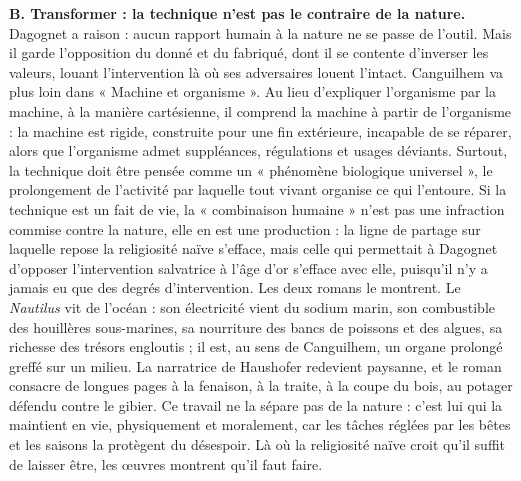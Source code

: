 \documentclass[11pt,a4paper]{article}
\begin{document}
\textbf{B. Transformer : la technique n'est pas le contraire de la nature.} Dagognet a raison : aucun rapport humain à la nature ne se passe de l'outil. Mais il garde l'opposition du donné et du fabriqué, dont il se contente d'inverser les valeurs, louant l'intervention là où ses adversaires louent l'intact. Canguilhem va plus loin dans « Machine et organisme ». Au lieu d'expliquer l'organisme par la machine, à la manière cartésienne, il comprend la machine à partir de l'organisme : la machine est rigide, construite pour une fin extérieure, incapable de se réparer, alors que l'organisme admet suppléances, régulations et usages déviants. Surtout, la technique doit être pensée comme un « phénomène biologique universel », le prolongement de l'activité par laquelle tout vivant organise ce qui l'entoure. Si la technique est un fait de vie, la « combinaison humaine » n'est pas une infraction commise contre la nature, elle en est une production : la ligne de partage sur laquelle repose la religiosité naïve s'efface, mais celle qui permettait à Dagognet d'opposer l'intervention salvatrice à l'âge d'or s'efface avec elle, puisqu'il n'y a jamais eu que des degrés d'intervention. Les deux romans le montrent. Le \emph{Nautilus} vit de l'océan : son électricité vient du sodium marin, son combustible des houillères sous-marines, sa nourriture des bancs de poissons et des algues, sa richesse des trésors engloutis ; il est, au sens de Canguilhem, un organe prolongé greffé sur un milieu. La narratrice de Haushofer redevient paysanne, et le roman consacre de longues pages à la fenaison, à la traite, à la coupe du bois, au potager défendu contre le gibier. Ce travail ne la sépare pas de la nature : c'est lui qui la maintient en vie, physiquement et moralement, car les tâches réglées par les bêtes et les saisons la protègent du désespoir. Là où la religiosité naïve croit qu'il suffit de laisser être, les œuvres montrent qu'il faut faire.
\end{document}
